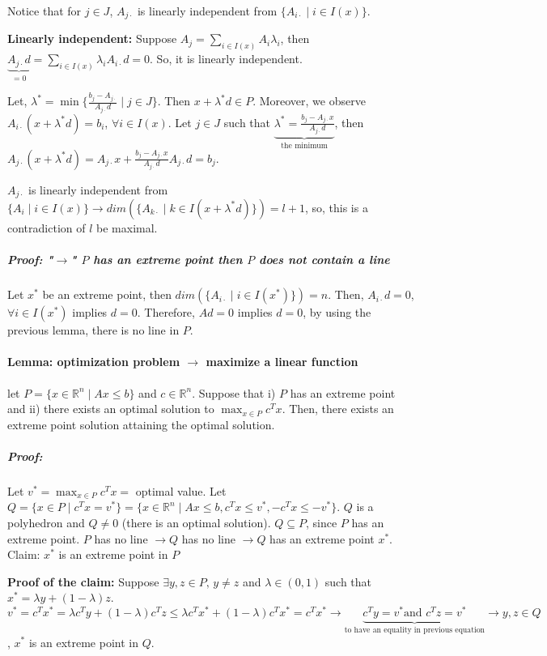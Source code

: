 \documentclass[main]{subfiles}
\begin{document}
Notice that for $j \in J$, $A_{j\cdot}$ is linearly independent from
$\{A_{i\cdot} \mid i \in I(x) \}$.

\begin{adjustwidth}{2.5em}{0pt}
\textbf{Linearly independent:} Suppose $A_{j} = \sum_{i \in I(x)} A_{i}
\lambda_{i}$, then $\underbrace{A_{j\cdot}d}_{=0} = \sum_{i \in I(x)} 
\lambda_{i} A_{i\cdot} d = 0$. So, it is linearly independent.
\end{adjustwidth}

Let, $\lambda^{*} = \min \{\frac{b_{j} - A_{j\cdot}}{A_{j\cdot}d} \mid j \in
J \}$. Then $x + \lambda^{*} d \in P$. Moreover, we observe $A_{i\cdot}(x +
\lambda^{*}d) = b_{i}$, $\forall i \in I(x)$.
Let $j \in J$ such that $\underbrace{ \lambda^{*} = \frac{b_{j} - A_{j\cdot}x}
{A_{j\cdot}d}}_{\text{the minimum}}$, then $A_{j\cdot}(x + \lambda^{*}d) =
A_{j\cdot}x + \frac{b_{j} - A_{j\cdot}x}{A_{j\cdot}d} A_{j\cdot}d = b_{j}$.

$A_{j\cdot}$ is linearly independent from $\{A_{i} \mid i \in I(x) \}
\rightarrow dim(\{A_{k\cdot} \mid k \in I(x + \lambda^{*}d)\}) = l+1$, so, this
is a contradiction of $l$ be maximal.

\subparagraph{Proof: "$\rightarrow$" $P$ has an extreme point then $P$ does not
contain a line}
Let $x^{*}$ be an extreme point, then $dim(\{A_{i\cdot} \mid i \in I(x^{*})\})
= n$. Then, $A_{i\cdot}d = 0$, $\forall i \in I(x^{*})$ implies $d=0$.
Therefore, $Ad=0$ implies $d=0$, by using the previous lemma, there is no line
in $P$.

\paragraph{Lemma: optimization problem $\rightarrow$ maximize a linear
function}
let $P = \{ x \in \mathbb{R}^{n} \mid Ax \leq b \}$ and $c \in \mathbb{R}^{n}$.
Suppose that i) $P$ has an extreme point and ii) there exists an optimal
solution to $\displaystyle \max_{x \in P} c^{T}x$. Then, there exists an
extreme point solution attaining the optimal solution.

\subparagraph{Proof:} Let $v^{*} = \displaystyle \max_{x \in P} c^{T}x =$
optimal value.
Let $Q = \{x \in P \mid c^{T}x = v^{*} \} = \{x \in \mathbb{R}^{n} \mid Ax \leq b,
c^{T}x \leq v^{*}, -c^{T}x \leq -v^{*} \}$. $Q$ is a polyhedron and $Q \neq 0$
(there is an optimal solution).
$Q \subseteq P$, since $P$ has an extreme point.
$P$ has no line $\rightarrow Q$ has no line $\rightarrow Q$ has an extreme
point $x^{*}$.
Claim: $x^{*}$ is an extreme point in $P$
\begin{adjustwidth}{2.5em}{0pt}
\textbf{Proof of the claim:}
Suppose $\exists y, z \in P \text{, } y \neq z$ and $ \lambda \in (0,1)$ such
that $x^{*} = \lambda y + (1-\lambda) z $.\\
$v^{*} = c^{T}x^{*} = \lambda c^{T}y + (1-\lambda)c^{T}z \leq \lambda c^{T}
x^{*} + (1-\lambda)c^{T}x^{*} = c^{T}x^{*} \rightarrow \underbrace{ c^{T}y =
v^{*} \text{and }c^{T}z = v^{*}}_{\text{to have an equality in previous
equation}} \rightarrow y, z \in Q$, $x^{*}$ is an extreme point in $Q$.
\end{adjustwidth}
\end{document}
